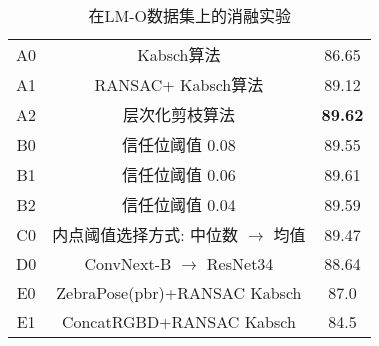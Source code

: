 \begin{table}
  \centering
  \begin{tabular}{@{}c|c|c@{}}
    \toprule
     A0 &Kabsch算法& 86.65 \\
     A1 &RANSAC+ Kabsch算法& 89.12 \\
     A2 &层次化剪枝算法 &\textbf{89.62}\\
     \midrule
     B0 &信任位阈值 0.08& 89.55 \\
     B1 &信任位阈值 0.06& 89.61 \\
     B2 &信任位阈值 0.04& 89.59 \\
     \midrule
     C0 &内点阈值选择方式: 中位数 $\rightarrow$ 均值 & 89.47 \\
     \midrule
     D0 & ConvNext-B\cite{Liu2022ACF} $\rightarrow$ ResNet34\cite{He2015DeepRL} & 88.64 \\
     \midrule
     E0 & ZebraPose(pbr)+RANSAC Kabsch&87.0\\
     E1 & ConcatRGBD+RANSAC Kabsch&84.5\\
    \bottomrule
  \end{tabular}
  \caption{在LM-O数据集上的消融实验}
  \label{tab:hipose_ablation_study}
\end{table}